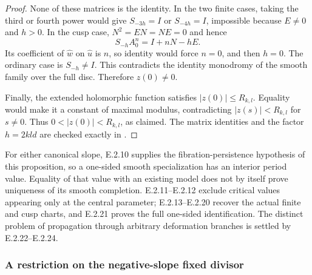 \begin{proof}
None of these matrices is the identity.  In the two
finite cases, taking the third or fourth power would
give $S_{-3h}=I$ or $S_{-4h}=I$, impossible because
$E\ne0$ and $h>0$.  In the cusp case, $N^2=EN=NE=0$
and hence
\[
 S_{-h}A_0^n=I+nN-hE.
\]
Its coefficient of $\widehat w$ on $\widehat u$ is
$n$, so identity would force $n=0$, and then $h=0$.
The ordinary case is $S_{-h}\ne I$.  This contradicts
the identity monodromy of the smooth family over
the full disc.  Therefore $z(0)\ne0$.

Finally, the extended holomorphic function satisfies
$|z(0)|\le R_{k,l}$.  Equality would make it a constant
of maximal modulus, contradicting $|z(s)|<R_{k,l}$
for $s\ne0$.  Thus $0<|z(0)|<R_{k,l}$, as claimed.
The matrix identities and the factor $h=2kld$ are
checked exactly in .
\end{proof}

\begin{remark}
For either canonical slope, E.2.10 supplies the
fibration-persistence hypothesis of this proposition,
so a one-sided smooth specialization has an interior
period value.  Equality of that value with an existing
model does not by itself prove uniqueness of its smooth
completion.  E.2.11--E.2.12 exclude critical values
appearing only at the central parameter; E.2.13--E.2.20
recover the actual finite and cusp charts, and E.2.21
proves the full one-sided identification.  The distinct
problem of propagation through arbitrary deformation
branches is settled by E.2.22--E.2.24.
\end{remark}

\subsubsection*{A restriction on the negative-slope fixed divisor}

